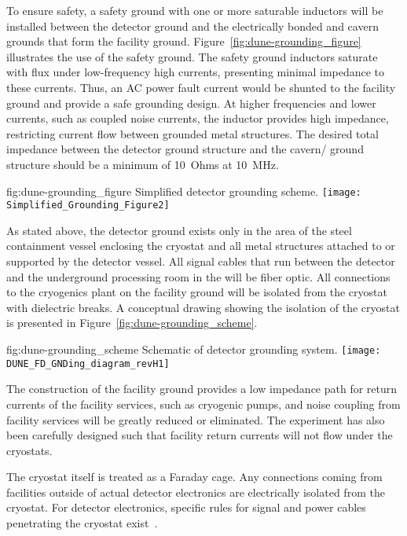 To ensure safety, a safety ground with one or more saturable inductors
will be installed between the detector ground and the electrically
bonded  and cavern grounds that form the facility ground.
Figure~\ref{fig:dune-grounding_figure} illustrates the use of the
safety ground. The safety ground inductors saturate with flux under
low-frequency high currents, presenting minimal impedance to these
currents.  Thus, an AC power fault current would be shunted to the
facility ground and provide a safe grounding design. At higher
frequencies and lower currents, such as coupled noise currents, the
inductor provides high impedance, restricting current flow
between grounded metal structures. The desired total impedance between
the detector ground structure and the cavern/ ground
structure should be a minimum of \SI{10}{Ohms} at \SI{10}{MHz}.
\begin{dunefigure}{fig:dune-grounding_figure}
  {Simplified detector grounding scheme.}
  \texttt{[image: Simplified\_Grounding\_Figure2]}
\end{dunefigure}

As stated above, the detector ground exists only in the area of the
steel containment vessel enclosing the cryostat and all metal
structures attached to or supported by the detector vessel.  All
signal cables that run between the detector and the  underground
processing room in the  will be fiber optic.
All connections to the cryogenics plant on the facility
ground will be isolated from the cryostat with dielectric breaks.  A
conceptual drawing showing the isolation of the cryostat is presented
in Figure~\ref{fig:dune-grounding_scheme}.
\begin{dunefigure}{fig:dune-grounding_scheme}
  {Schematic of detector grounding system.}
  \texttt{[image: DUNE\_FD\_GNDing\_diagram\_revH1]}
\end{dunefigure}

The construction of the facility ground provides a low impedance path
for return currents of the facility services, such as cryogenic pumps,
and noise coupling from facility services will be greatly reduced or
eliminated.  The experiment has also been carefully designed such that
facility return currents will not flow under the cryostats.

The cryostat itself is treated as a Faraday cage.  Any connections
coming from facilities outside of actual detector electronics are
electrically isolated from the cryostat.  For detector electronics,
specific rules for signal and power cables penetrating the cryostat
exist~\cite{bib:cernedms2095958}. %






